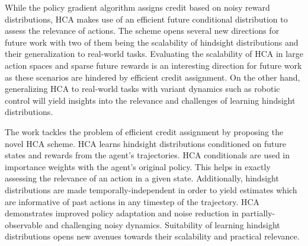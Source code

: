 \documentclass[11pt,letterpaper]{article}
\begin{document}
While the policy gradient algorithm assigns credit based on noisy reward distributions, HCA makes use of an efficient future conditional distribution to assess the relevance of actions. The scheme opens several new directions for future work with two of them being the scalability of hindsight distributions and their generalization to real-world tasks. Evaluating the scalability of HCA in large action spaces and sparse future rewards is an interesting direction for future work as these scenarios are hindered by efficient credit assignment. On the other hand, generalizing HCA to real-world tasks with variant dynamics such as robotic control will yield insights into the relevance and challenges of learning hindsight distributions. 

The work tackles the problem of efficient credit assignment by proposing the novel HCA scheme. HCA learns hindsight distributions conditioned on future states and rewards from the agent's trajectories. HCA conditionals are used in importance weights with the agent's original policy. This helps in exactly assessing the relevance of an action in a given state. Additionally, hindsight distributions are made temporally-independent in order to yield estimates which are informative of past actions in any timestep of the trajectory. HCA demonstrates improved policy adaptation and noise reduction in partially-observable and challenging noisy dynamics. Suitability of learning hindsight distributions opens new avenues towards their scalability and practical relevance. 
\end{document}
